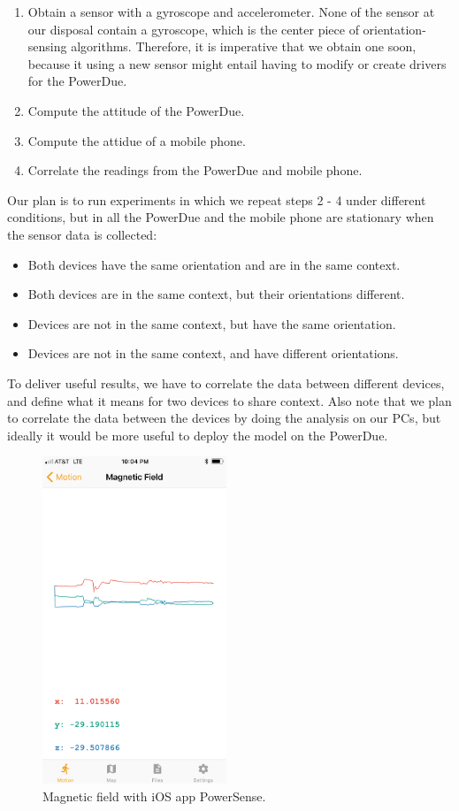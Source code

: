 \documentclass[journal]{IEEEtranTIE}
\begin{document}
\begin{enumerate}
\item Obtain a sensor with a gyroscope and accelerometer. None of the sensor at
      our disposal contain a gyroscope, which is the center piece of
      orientation-sensing algorithms. Therefore, it is imperative that we obtain
      one soon, because it using a new sensor might entail having to modify or
      create drivers for the PowerDue.
\item Compute the attitude of the PowerDue.
\item Compute the attidue of a mobile phone.
\item Correlate the readings from the PowerDue and mobile phone.
\end{enumerate}

Our plan is to run experiments in which we repeat steps 2 - 4 under different
conditions, but in all the PowerDue and the mobile phone are stationary when the
sensor data is collected:

\begin{itemize}
\item Both devices have the same orientation and are in the same context.
\item Both devices are in the same context, but their orientations different.
\item Devices are not in the same context, but have the same orientation.
\item Devices are not in the same context, and have different orientations.
\end{itemize}

To deliver useful results, we have to correlate the data between different
devices, and define what it means for two devices to share context. Also note
that we plan to correlate the data between the devices by doing the
analysis on our PCs, but ideally it would be more useful to deploy the model
on the PowerDue.

\begin{figure}[!t]\centering
	\includegraphics[width=5.5cm]{magnetic_field}
	\caption{Magnetic field with iOS app PowerSense.}\label{fig:fig3}
\end{figure}



\ %
\end{document}
